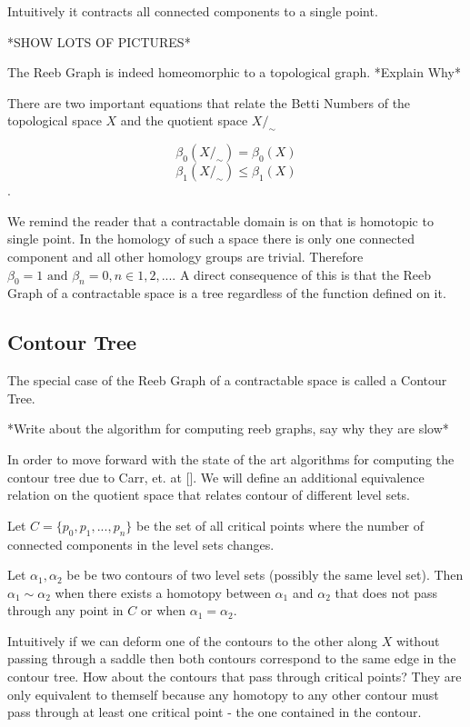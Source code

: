Intuitively it contracts all connected components to a single point.

*SHOW LOTS OF PICTURES*


The Reeb Graph is indeed homeomorphic to a topological graph. *Explain Why*

There are two important equations that \cite{comp-topo} relate the Betti Numbers of the topological space $X$ and the quotient space $X \big/ _\sim$

$$ \beta_0(X \big/ _\sim) = \beta_0(X) $$
$$ \beta_1(X \big/ _\sim) \le \beta_1(X) $$.

We remind the reader that a contractable domain is on that is homotopic to single point. In the homology of such a space there is only one connected component and all other homology groups are trivial. Therefore $\beta_0 = 1 \text{ and } \beta_n = 0, n \in {1, 2, ...}$. A direct consequence of this is that the Reeb Graph of a contractable space is a tree regardless of the function defined on it.

\subsection{Contour Tree}

The special case of the Reeb Graph of a contractable space is called a Contour Tree. 

*Write about the algorithm for computing reeb graphs, say why they are slow*

In order to move forward with the state of the art algorithms for computing the contour tree due to Carr, et. at []. We will define an additional equivalence relation on the quotient space that relates contour of different level sets.


\begin{defn}  Let $C = \{p_0, p_1, ..., p_n\}$ be the set of all critical points where the number of connected components in the level sets changes. \end{defn}


\begin{defn}   
    Let $\alpha_1, \alpha_2$ be be two contours of two level sets (possibly the same level set). Then $\alpha_1 \sim \alpha_2$ when there exists a homotopy between $\alpha_1$ and $\alpha_2$ that does not pass through any point in $C$ or when $\alpha_1 = \alpha_2$.
\end{defn}


Intuitively if we can deform one of the contours to the other along $X$ without passing through a saddle then both contours correspond to the same edge in the contour tree. How about the contours that pass through critical points? They are only equivalent to themself because any homotopy to any other contour must pass through at least one critical point - the one contained in the contour.


